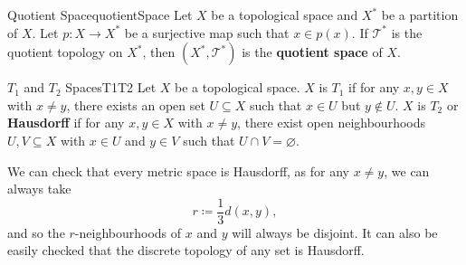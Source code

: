 \documentclass[math]{amznotes}
\theoremstyle{remark}
\begin{document}
\begin{dfnbox}{Quotient Space}{quotientSpace}
    Let $X$ be a topological space and $X^*$ be a partition of $X$. Let $p \colon X \to X^*$ be a surjective map such that $x \in p\left(x\right)$. If $\mathcal{T}^*$ is the quotient topology on $X^*$, then $\left(X^*, \mathcal{T}^*\right)$ is the {\color{red} \textbf{quotient space}} of $X$.
\end{dfnbox}
\begin{dfnbox}{$T_1$ and $T_2$ Spaces}{T1T2}
    Let $X$ be a topological space. $X$ is {\color{red} \textbf{$T_1$}} if for any $x, y \in X$ with $x \neq y$, there exists an open set $U \subseteq X$ such that $x \in U$ but $y \notin U$. $X$ is {\color{red} \textbf{$T_2$}} or {\color{red} \textbf{Hausdorff}} if for any $x, y \in X$ with $x \neq y$, there exist open neighbourhoods $U, V \subseteq X$ with $x \in U$ and $y \in V$ such that $U \cap V = \varnothing$.
\end{dfnbox}
We can check that every metric space is Hausdorff, as for any $x \neq y$, we can always take 
\begin{equation*}
    r \coloneqq \frac{1}{3}d\left(x, y\right),
\end{equation*}
and so the $r$-neighbourhoods of $x$ and $y$ will always be disjoint. It can also be easily checked that the discrete topology of any set is Hausdorff.
\end{document}
